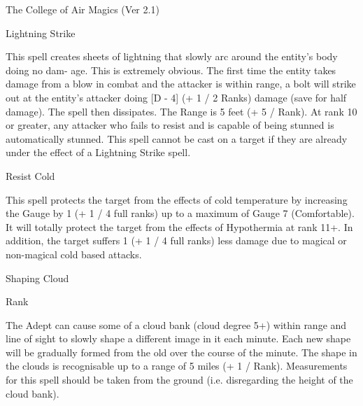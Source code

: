 \begin{Chapter}{The College of Air Magics (Ver 2.1)}
\begin{spell}[S-11]{Lightning Strike }
\begin{effects}
 This  spell  creates  sheets  of  lightning  that 
slowly arc around the entity’s body doing no dam-
age.  This  is  extremely  obvious.  The  first  time  the 
entity takes damage from a blow in combat and the 
attacker is within range, a bolt will strike out at the 
entity’s  attacker  doing  [D  -  4]  (+  1  /  2  Ranks) 
damage  (save  for  half  damage).  The  spell  then 
dissipates.  The  Range  is  5  feet  (+  5  /  Rank).  At 
rank  10  or  greater,  any  attacker  who  fails  to  resist 
and  is  capable  of  being  stunned  is  automatically 
stunned.  This  spell  cannot  be  cast  on  a  target  if 
they  are  already  under  the  effect  of  a  Lightning 
Strike spell. 

\end{effects}
\end{spell}

\begin{spell}[S-12]{Resist Cold }

\begin{effects}
 This  spell  protects  the  target  from  the 
effects  of  cold  temperature  by  increasing  the 
Gauge by 1 (+ 1 / 4 full ranks) up to a maximum of 
Gauge  7  (Comfortable).  It  will  totally  protect  the 
target from the effects of Hypothermia at rank 11+. 
In addition, the target suffers 1 (+ 1 / 4 full ranks) 
less  damage  due  to  magical  or  non-magical  cold 
based attacks. 

\end{effects}
\end{spell}

\begin{spell}[S-13]{Shaping Cloud }

Rank 
\begin{effects}
The Adept can cause some of a cloud bank 
(cloud degree 5+) within range and line of sight to 
slowly  shape  a  different  image  in  it  each  minute. 
Each new shape will be gradually formed from the 
old over the course of the minute. The shape in the 
clouds is recognisable up to a range of 5 miles (+ 1 
/  Rank).  Measurements  for  this  spell  should  be 
taken from the ground (i.e. disregarding the height 
of the cloud bank). 


\end{effects}
\end{spell}
\end{Chapter}
